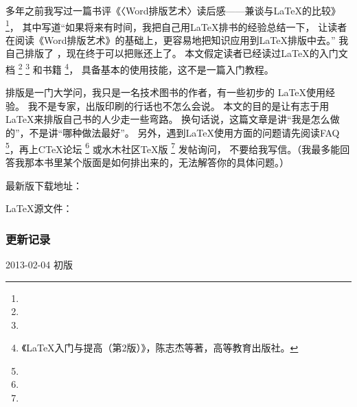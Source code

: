 多年之前我写过一篇书评《〈Word排版艺术〉读后感——兼谈与\LaTeX 的比较》
\footnote{}，
其中写道{\kaishu “如果将来有时间，我把自己用\LaTeX 排书的经验总结一下，
让读者在阅读《Word排版艺术》的基础上，更容易地把知识应用到\LaTeX 排版中去。”}
我自己排版了 \mybooktitle，现在终于可以把账还上了。
本文假定读者已经读过\LaTeX 的入门文档
\footnote{}
\footnote{}
和书籍
\footnote{《\LaTeX 入门与提高（第2版）》，陈志杰等著，高等教育出版社。}，
具备基本的使用技能，这不是一篇入门教程。

排版是一门大学问，我只是一名技术图书的作者，有一些初步的 \LaTeX 使用经验。
我不是专家，出版印刷的行话也不怎么会说。
本文的目的是让有志于用\LaTeX 来排版自己书的人少走一些弯路。
换句话说，这篇文章是讲“我是怎么做的”，不是讲“哪种做法最好”。
另外，遇到\LaTeX 使用方面的问题请先阅读FAQ
\footnote{}，再上CTeX论坛
\footnote{ } 或水木社区TeX版 \nolinebreak
\footnote{} 发帖询问，
不要给我写信。（我最多能回答我那本书里某个版面是如何排出来的，无法解答你的具体问题。）

最新版下载地址：

\LaTeX 源文件：

\subsubsection{更新记录}
\begindot
\item[] 2013-02-04 初版
\myenddot
